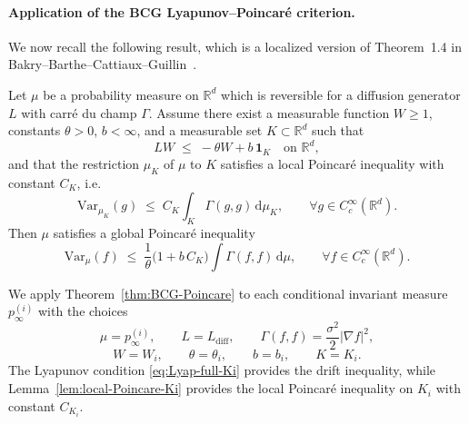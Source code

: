 \paragraph{Application of the BCG Lyapunov–Poincar\'e criterion.}
We now recall the following result, which is a localized version of
Theorem~1.4 in Bakry--Barthe--Cattiaux--Guillin~\cite{bakry2008simple}.

\begin{theorem}\label{thm:BCG-Poincare}
Let \(\mu\) be a probability measure on \(\mathbb R^d\) which is reversible
for a diffusion generator \(L\) with carré du champ \(\Gamma\).
Assume there exist a measurable function \(W\ge 1\), constants
\(\theta>0\), \(b<\infty\), and a measurable set \(K\subset\mathbb R^d\) such that
\[
LW \;\le\; -\theta W + b\,\mathbf 1_K
\quad\text{on }\mathbb R^d,
\]
and that the restriction \(\mu_K\) of \(\mu\) to \(K\) satisfies a local
Poincar\'e inequality with constant \(C_K\), i.e.
\[
\mathrm{Var}_{\mu_K}(g)
\;\le\;
C_K \int_K \Gamma(g,g)\,\mathrm d\mu_K,
\qquad
\forall g\in C_c^\infty(\mathbb R^d).
\]
Then \(\mu\) satisfies a global Poincar\'e inequality
\[
\mathrm{Var}_\mu(f)
\;\le\;
\frac{1}{\theta}\bigl(1 + b\,C_K\bigr)
\int \Gamma(f,f)\,\mathrm d\mu,
\qquad
\forall f\in C_c^\infty(\mathbb R^d).
\]
\end{theorem}

We apply Theorem~\ref{thm:BCG-Poincare} to each conditional invariant
measure \(p_\infty^{(i)}\) with the choices
\[
\mu = p_\infty^{(i)},\qquad
L = L_{\mathrm{diff}},\qquad
\Gamma(f,f) = \frac{\sigma^2}{2}|\nabla f|^2,
\]
\[
W = W_i,\qquad
\theta = \theta_i,\qquad
b = b_i,\qquad
K = K_i.
\]
The Lyapunov condition \eqref{eq:Lyap-full-Ki} provides the drift inequality,
while Lemma~\ref{lem:local-Poincare-Ki} provides the local Poincar\'e
inequality on \(K_i\) with constant \(C_{K_i}\).

